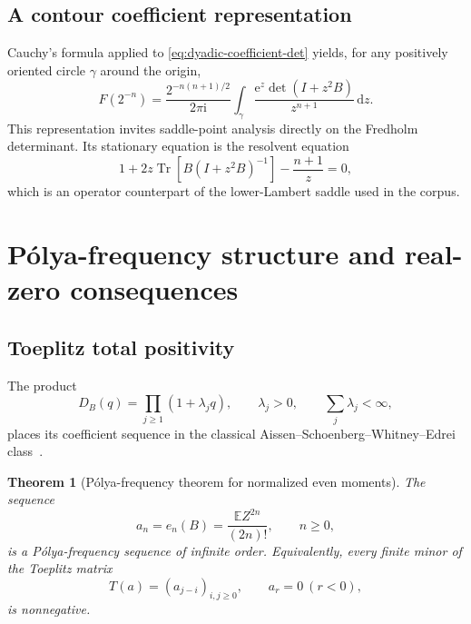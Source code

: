 \documentclass[11pt,oneside]{article}
\newtheorem{theorem}{Theorem}[section]
\theoremstyle{definition}
\newcommand{\dd}{\,\mathrm d}
\newcommand{\e}{\mathrm e}
\newcommand{\ii}{\mathrm i}
\newcommand{\E}{\mathbb E}
\newcommand{\Tr}{\operatorname{Tr}}
\begin{document}
\subsection{A contour coefficient representation}

Cauchy's formula applied to \eqref{eq:dyadic-coefficient-det} yields, for any
positively oriented circle \(\gamma\) around the origin,
\begin{equation}
 F(2^{-n})=\frac{2^{-n(n+1)/2}}{2\pi\ii}
 \int_{\gamma}\frac{\e^z\det(I+z^2B)}{z^{n+1}}\dd z.
 \label{eq:dyadic-Cauchy}
\end{equation}
This representation invites saddle-point analysis directly on the Fredholm
determinant.  Its stationary equation is the resolvent equation
\begin{equation}
 1+2z\Tr[B(I+z^2B)^{-1}]-\frac{n+1}{z}=0,
 \label{eq:operator-saddle}
\end{equation}
which is an operator counterpart of the lower-Lambert saddle used in the corpus.

\section{P\'olya-frequency structure and real-zero consequences}
\label{sec:PF}

\subsection{Toeplitz total positivity}

The product
\begin{equation}
 D_B(q)=\prod_{j\ge1}(1+\lambda_jq),
 \qquad \lambda_j>0,
 \qquad \sum_j\lambda_j<\infty,
 \label{eq:DB-positive-product}
\end{equation}
places its coefficient sequence in the classical Aissen--Schoenberg--Whitney--Edrei
class~\cite{ASW1952,Edrei1952,Schoenberg1951}.

\begin{theorem}[P\'olya-frequency theorem for normalized even moments]
\label{thm:PF}
The sequence
\begin{equation}
 a_n=e_n(B)=\frac{\E Z^{2n}}{(2n)!},\qquad n\ge0,
 \label{eq:an-PF}
\end{equation}
is a P\'olya-frequency sequence of infinite order.  Equivalently, every finite minor
of the Toeplitz matrix
\begin{equation}
 T(a)=(a_{j-i})_{i,j\ge0},\qquad a_r=0\ (r<0),
 \label{eq:Toeplitz-a}
\end{equation}
is nonnegative.
\end{theorem}
\end{document}
